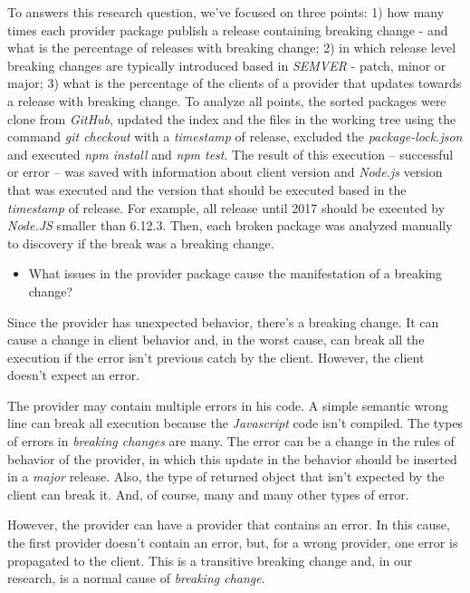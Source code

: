 To answers this research question, we've focused on three points: 1) how many times each provider package publish a release containing breaking change - and what is the percentage of releases with breaking change; 2) in which release level breaking changes are typically introduced based in \textit{SEMVER} - patch, minor or major; 3) what is the percentage of the clients of a provider that updates towards a release with breaking change. To analyze all points, the sorted packages were clone from \textit{GitHub}, updated the index and the files in the working tree using the command \textit{git checkout} with a \textit{timestamp} of release, excluded the \textit{package-lock.json} and executed \textit{npm install} and \textit{npm test}. The result of this execution -- successful or error -- was saved with information about client version and \textit{Node.js} version that was executed and the version that should be executed based in the \textit{timestamp} of release. For example, all release until 2017 should be executed by \textit{Node.JS} smaller than 6.12.3. Then, each broken package was analyzed manually to discovery if the break was a breaking change.

\begin{itemize}
    \item What issues in the provider package cause the manifestation of a breaking change?
\end{itemize}

Since the provider has unexpected behavior, there's a breaking change. It can cause a change in client behavior and, in the worst cause, can break all the execution if the error isn't previous catch by the client. However, the client doesn't expect an error.

The provider may contain multiple errors in his code. A simple semantic wrong line can break all execution because the \textit{Javascript} code isn't compiled. The types of errors in \textit{breaking changes} are many.  The error can be a change in the rules of behavior of the provider, in which this update in the behavior should be inserted in a \textit{major} release. Also, the type of returned object that isn't expected by the client can break it. And, of course, many and many other types of error.

However, the provider can have a provider that contains an error. In this cause, the first provider doesn't contain an error, but, for a wrong provider, one error is propagated to the client. This is a transitive breaking change and, in our research, is a normal cause of \textit{breaking change}.

